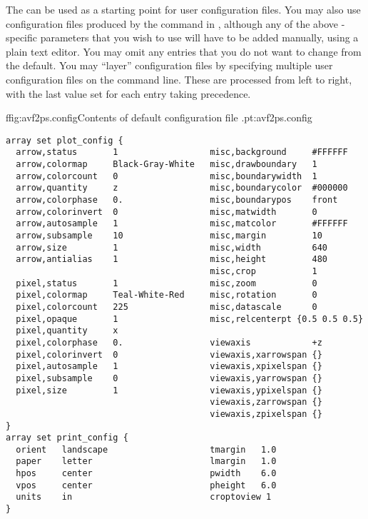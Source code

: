 The  can be used as a starting point for
user configuration files.  You may also use configuration files produced
by the  command in
, although any of the above
-specific parameters that you wish to use will have to be
added manually, using a plain text editor.  You may omit any entries
that you do not want to change from the default.  You may ``layer''
configuration files by specifying multiple user configuration files on
the command line.  These are processed from left to right, with the last
value set for each entry taking precedence.

\begin{codelisting}{f}{fig:avf2ps.config}{Contents of default configuration
file .}{pt:avf2ps.config}
\begin{verbatim}
array set plot_config {
  arrow,status       1                  misc,background     #FFFFFF
  arrow,colormap     Black-Gray-White   misc,drawboundary   1
  arrow,colorcount   0                  misc,boundarywidth  1
  arrow,quantity     z                  misc,boundarycolor  #000000
  arrow,colorphase   0.                 misc,boundarypos    front
  arrow,colorinvert  0                  misc,matwidth       0
  arrow,autosample   1                  misc,matcolor       #FFFFFF
  arrow,subsample    10                 misc,margin         10
  arrow,size         1                  misc,width          640
  arrow,antialias    1                  misc,height         480
                                        misc,crop           1
  pixel,status       1                  misc,zoom           0
  pixel,colormap     Teal-White-Red     misc,rotation       0
  pixel,colorcount   225                misc,datascale      0
  pixel,opaque       1                  misc,relcenterpt {0.5 0.5 0.5}
  pixel,quantity     x
  pixel,colorphase   0.                 viewaxis            +z
  pixel,colorinvert  0                  viewaxis,xarrowspan {}
  pixel,autosample   1                  viewaxis,xpixelspan {}
  pixel,subsample    0                  viewaxis,yarrowspan {}
  pixel,size         1                  viewaxis,ypixelspan {}
                                        viewaxis,zarrowspan {}
                                        viewaxis,zpixelspan {}
}
array set print_config {
  orient   landscape                    tmargin   1.0
  paper    letter                       lmargin   1.0
  hpos     center                       pwidth    6.0
  vpos     center                       pheight   6.0
  units    in                           croptoview 1
}
\end{verbatim}
\end{codelisting}

